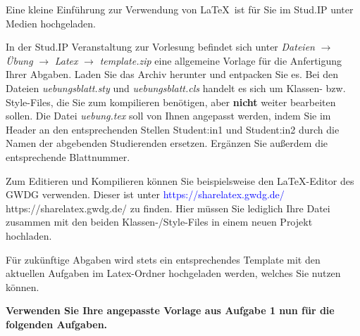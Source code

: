 \documentclass[11pt]{uebungsblatt}
\def\url#1{\expandafter \textcolor{blue}{#1} \csname #1\endcsname}
\begin{document}
\begin{aufgabe}
	Eine kleine Einführung zur Verwendung von \LaTeX\ ist für Sie im Stud.IP unter Medien hochgeladen.

	In der Stud.IP Veranstaltung zur Vorlesung befindet sich unter \textit{Dateien} $\rightarrow$ \textit{Übung} $\rightarrow$ \textit{Latex} $\rightarrow$ \textit{template.zip} eine allgemeine Vorlage für die Anfertigung Ihrer Abgaben.
	Laden Sie das Archiv herunter und entpacken Sie es.
	Bei den Dateien \textit{uebungsblatt.sty} und \textit{uebungsblatt.cls} handelt es sich um Klassen- bzw. Style-Files,
	die Sie zum kompilieren benötigen, aber \textbf{nicht} weiter bearbeiten sollen.
	Die Datei \textit{uebung.tex} soll von Ihnen angepasst werden,
	indem Sie im Header an den entsprechenden Stellen {Student:in1} und {Student:in2} durch die Namen der abgebenden Studierenden ersetzen.
	Ergänzen Sie außerdem die entsprechende Blattnummer.

	Zum Editieren und Kompilieren können Sie beispielsweise den \LaTeX-Editor des GWDG verwenden.
	Dieser ist unter \url{https://sharelatex.gwdg.de/} zu finden.
	Hier müssen Sie lediglich Ihre Datei zusammen mit den beiden Klassen-/Style-Files in einem neuen Projekt hochladen.

	Für zukünftige Abgaben wird stets ein entsprechendes Template mit den aktuellen Aufgaben im Latex-Ordner hochgeladen werden,
	welches Sie nutzen können.
\end{aufgabe}

\textbf{Verwenden Sie Ihre angepasste Vorlage aus Aufgabe 1 nun für die folgenden Aufgaben.}
\end{document}
